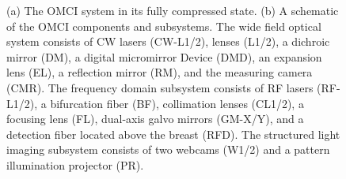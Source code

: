 \begin{figure}[]
    \begin{center}
    \end{center}
    \caption{(a) The OMCI system in its fully compressed state. (b) A schematic of the OMCI components and subsystems. The wide field optical system consists of CW lasers (CW-L1/2), lenses (L1/2), a dichroic mirror (DM), a digital micromirror Device (DMD), an expansion lens (EL), a reflection mirror (RM), and the measuring camera (CMR). The frequency domain subsystem consists of RF lasers (RF-L1/2), a bifurcation fiber (BF), collimation lenses (CL1/2), a focusing lens (FL), dual-axis galvo mirrors (GM-X/Y), and a detection fiber located above the breast (RFD). The structured light imaging subsystem consists of two webcams (W1/2) and a pattern illumination projector (PR).} 
    \label{fig:OMCISystem}
\end{figure} 

